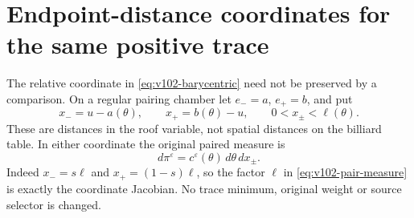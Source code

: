 \section{Endpoint-distance coordinates for the same positive trace}
\label{sec:v103-gap}
The relative coordinate in \eqref{eq:v102-barycentric} need not be
preserved by a comparison. On a regular pairing chamber let
$e_-=a$, $e_+=b$, and put
\[
 x_-=u-a(\theta),\qquad x_+=b(\theta)-u,
 \qquad 0<x_\pm<\ell(\theta).
\]
These are distances in the roof variable, not spatial distances on
the billiard table. In either coordinate the original paired measure is
\begin{equation}\label{eq:v103-gap-measure}
 d\pi^\varepsilon=c^\varepsilon(\theta)\,d\theta\,dx_\pm.
\end{equation}
Indeed $x_-=s\ell$ and $x_+=(1-s)\ell$, so the factor $\ell$
in \eqref{eq:v102-pair-measure} is exactly the coordinate Jacobian.
No trace minimum, original weight or source selector is changed.

